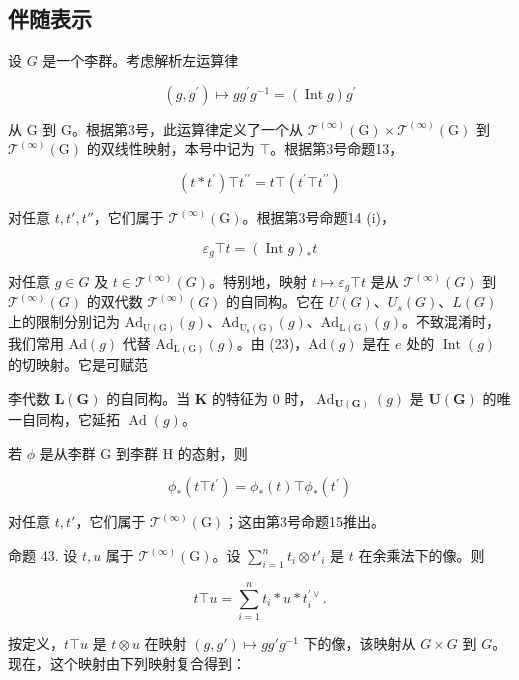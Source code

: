 \subsection{伴随表示}

设 \(G\) 是一个李群。考虑解析左运算律

\[
(g, g ^ {\prime}) \mapsto g g ^ {\prime} g ^ {- 1} = (\operatorname{Int} g) g ^ {\prime}
\]

从 G 到 G。根据第3号，此运算律定义了一个从 \(\mathcal{T}^{(\infty)}(\mathrm{G})\times \mathcal{T}^{(\infty)}(\mathrm{G})\) 到 \(\mathcal{T}^{(\infty)}(\mathrm{G})\) 的双线性映射，本号中记为 \(\top\)。根据第3号命题13，

\[
(t * t ^ {\prime}) \top t ^ {\prime \prime} = t \top (t ^ {\prime} \top t ^ {\prime \prime})\tag{22}
\]

对任意 \(t, t', t''\)，它们属于 \(\mathcal{T}^{(\infty)}(\mathrm{G})\)。根据第3号命题14 (i)，

\[
\varepsilon_ {g} \top t = (\operatorname{Int} g) _ {*} t\tag{23}
\]

对任意 \(g \in G\) 及 \(t \in \mathcal{T}^{(\infty)}(G)\)。特别地，映射 \(t \mapsto \varepsilon_{g} \top t\) 是从 \(\mathcal{T}^{(\infty)}(G)\) 到 \(\mathcal{T}^{(\infty)}(G)\) 的双代数 \(\mathcal{T}^{(\infty)}(G)\) 的自同构。它在 \(U(G)\)、\(U_{s}(G)\)、\(L(G)\) 上的限制分别记为 \(\mathrm{Ad}_{\mathrm{U(G)}}(g)\)、\(\mathrm{Ad}_{\mathrm{U_s(G)}}(g)\)、\(\mathrm{Ad}_{\mathrm{L(G)}}(g)\)。不致混淆时，我们常用 \(\mathrm{Ad}(g)\) 代替 \(\mathrm{Ad}_{\mathrm{L(G)}}(g)\)。由 (23)，\(\mathrm{Ad}(g)\) 是在 \(e\) 处的 \(\operatorname{Int}(g)\) 的切映射。它是可赋范

李代数 \(\mathbf{L}(\mathbf{G})\) 的自同构。当 \(\mathbf{K}\) 的特征为 0 时，\(\operatorname{Ad}_{\mathbf{U}(\mathbf{G})}(g)\) 是 \(\mathbf{U}(\mathbf{G})\) 的唯一自同构，它延拓 \(\operatorname{Ad}(g)\)。

若 \(\phi\) 是从李群 G 到李群 H 的态射，则

\[
\phi_ {*} (t \top t ^ {\prime}) = \phi_ {*} (t) \top \phi_ {*} (t ^ {\prime})\tag{24}
\]

对任意 \(t, t'\)，它们属于 \(\mathcal{T}^{(\infty)}(\mathrm{G})\)；这由第3号命题15推出。

命题 43. 设 \(t, u\) 属于 \(\mathcal{T}^{(\infty)}(\mathrm{G})\)。设 \(\sum_{i=1}^{n} t_i \otimes t'_i\) 是 \(t\) 在余乘法下的像。则

\[
t \top u = \sum_ {i = 1} ^ {n} t _ {i} * u * t _ {i} ^ {\prime \vee}.
\]

按定义，\(t \top u\) 是 \(t \otimes u\) 在映射 \((g, g') \mapsto gg'g^{-1}\) 下的像，该映射从 \(G \times G\) 到 \(G\)。现在，这个映射由下列映射复合得到：

